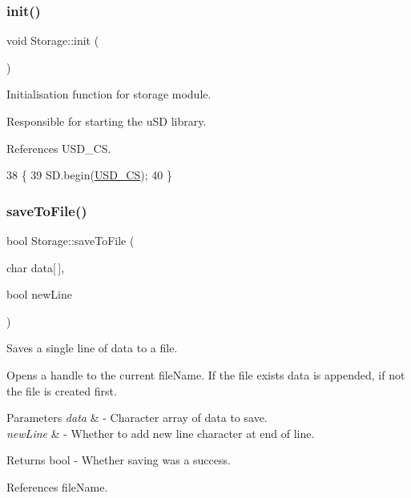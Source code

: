 \subsubsection{\texorpdfstring{init()}{init()}}
{\footnotesize\ttfamily void Storage\+::init (\begin{DoxyParamCaption}{ }\end{DoxyParamCaption})}



Initialisation function for storage module. 

Responsible for starting the u\+SD library. 

References U\+S\+D\+\_\+\+CS.


\begin{DoxyCode}
38 \{
39   SD.begin(\hyperlink{_storage_8cpp_abe774366dbdfb2de4e34e4f07843db38}{USD\_CS});
40 \}
\end{DoxyCode}
\mbox{\label{class_storage_a044a17325b2917afca49aa19ddb488f6}} 
\subsubsection{\texorpdfstring{save\+To\+File()}{saveToFile()}}
{\footnotesize\ttfamily bool Storage\+::save\+To\+File (\begin{DoxyParamCaption}\item[{char}]{data\mbox{[}$\,$\mbox{]},  }\item[{bool}]{new\+Line }\end{DoxyParamCaption})}



Saves a single line of data to a file. 

Opens a handle to the current file\+Name. If the file exists data is appended, if not the file is created first.


\begin{DoxyParams}{Parameters}
{\em data} & -\/ Character array of data to save. \\
\hline
{\em new\+Line} & -\/ Whether to add new line character at end of line. \\
\hline
\end{DoxyParams}
\begin{DoxyReturn}{Returns}
bool -\/ Whether saving was a success. 
\end{DoxyReturn}


References file\+Name.


